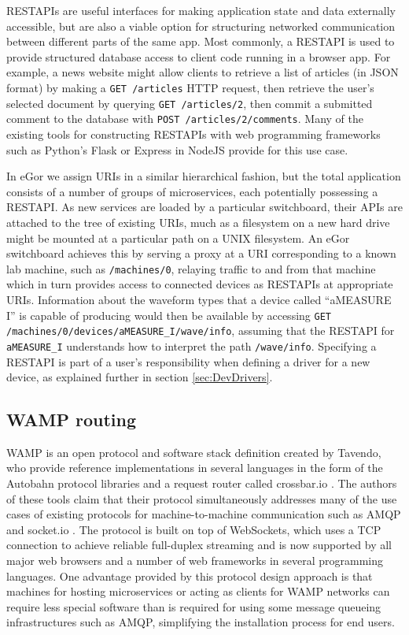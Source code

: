 \documentclass[../thesis]{subfiles}
\begin{document}
\glspl{RESTAPI} are useful interfaces for making application state and
data externally accessible, but are also a viable option for
structuring networked communication between different parts of the
same app. Most commonly, a \gls{RESTAPI} is used to provide structured
database access to client code running in a browser app. For example,
a news website might allow clients to retrieve a list of articles (in
\gls{JSON} format) by making a \texttt{GET /articles} HTTP request,
then retrieve the user's selected document by querying \texttt{GET
  /articles/2}, then commit a submitted comment to the database with
\texttt{POST /articles/2/comments}. Many of the existing tools for
constructing \glspl{RESTAPI} with web programming frameworks such as
Python's Flask \cite{Flask} or Express in NodeJS \cite{Express}
provide for this use case.

In eGor we assign URIs in a similar hierarchical fashion, but the
total application consists of a number of groups of microservices,
each potentially possessing a \gls{RESTAPI}. As new services are
loaded by a particular switchboard, their \glspl{API} are attached to
the tree of existing \glspl{URI}, much as a filesystem on a new hard
drive might be mounted at a particular path on a UNIX filesystem.  An
eGor switchboard achieves this by serving a proxy at a \gls{URI}
corresponding to a known lab machine, such as \texttt{/machines/0},
relaying traffic to and from that machine which in turn provides
access to connected devices as \glspl{RESTAPI} at appropriate
\glspl{URI}. Information about the waveform types that a device called
``aMEASURE I'' is capable of producing would then be available by
accessing \texttt{GET /machines/0/devices/aMEASURE\_I/wave/info},
assuming that the \gls{RESTAPI} for \texttt{aMEASURE\_I} understands
how to interpret the path \texttt{/wave/info}. Specifying a
\gls{RESTAPI} is part of a user's responsibility when defining a
driver for a new device, as explained further in section
\ref{sec:DevDrivers}.

\subsection{WAMP routing}
\gls{WAMP} is an open protocol and software stack definition created
by Tavendo, who provide reference implementations in several languages
in the form of the Autobahn protocol libraries and a request router
called crossbar.io \cite{CrossbarIO}. The authors of these tools claim
that their protocol simultaneously addresses many of the use cases of
existing protocols for machine-to-machine communication such as
\gls{AMQP} and socket.io \cite{socket.io}. The protocol is built on
top of WebSockets, which uses a TCP connection to achieve reliable
full-duplex streaming and is now supported by all major web browsers
and a number of web frameworks in several programming languages. One
advantage provided by this protocol design approach is that machines
for hosting microservices or acting as clients for \gls{WAMP} networks
can require less special software than is required for using some
message queueing infrastructures such as \gls{AMQP}, simplifying the
installation process for end users.
\end{document}
